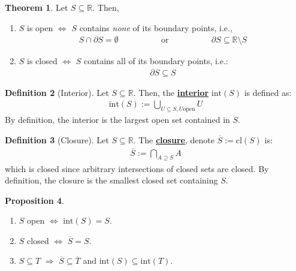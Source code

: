 \documentclass[reqno,11pt]{amsart}
\theoremstyle{definition}
\newtheorem{theorem}{Theorem}
\newtheorem{prop}[theorem]{Proposition}
\theoremstyle{definition}
\newtheorem{definition}[theorem]{Definition}
\theoremstyle{remark}
\newcommand{\R}{\mathbb{R}}
\newcommand{\dfn}[1]{\underline{\textbf{#1}}}
\begin{document}
\begin{theorem}
	Let $S \subseteq \R$. Then, 
	\begin{enumerate}[noitemsep]
		\item $S$ is open $\iff$ $S$ contains \emph{none} of its boundary points, i.e., 
		\begin{align}
			S \cap \partial S = \emptyset \hspace{2cm} \text{ or } \hspace{2cm} \partial S \subseteq \R \setminus S	
		\end{align}
		\item $S$ is closed $\iff$ $S$ contains all of its boundary points, i.e.:
		\begin{align}
			\partial S \subseteq S	
		\end{align}
	\end{enumerate}
\end{theorem}


\begin{definition}[Interior] 
	Let $S \subseteq \R$. Then, the \dfn{interior} $\mathrm{int}(S)$ is defined as: 
	\begin{align}
		\mathrm{int}(S) := \bigcup_{U \subseteq S, U \mathrm{ open}}U	
	\end{align}
	By definition, the interior is the largest open set contained in $S$. 
\end{definition}

\begin{definition}[Closure]
	Let $S \subseteq \R$. The \dfn{closure}, denote $\overline{S} := \mathrm{cl}(S)$ is:
	\begin{align}
		\overline{S} := \bigcap_{A \supseteq S} A 	
	\end{align}
	which is closed since arbitrary intersections of closed sets are closed. By definition, the closure is the smallest closed set containing $S$. 
\end{definition}

\begin{prop}
	\begin{enumerate}[noitemsep]
		\item $S$ open $\iff$ $\mathrm{int}(S) = S$. 
		\item $S$ closed $\iff$ $\overline{S} = S$. 
		\item $S\subseteq T$ $\Rightarrow$ $\overline{S} \subseteq \overline{T}$ and $\mathrm{int}(S) \subseteq \mathrm{int}({T})$.
	\end{enumerate}
\end{prop}
\end{document}
